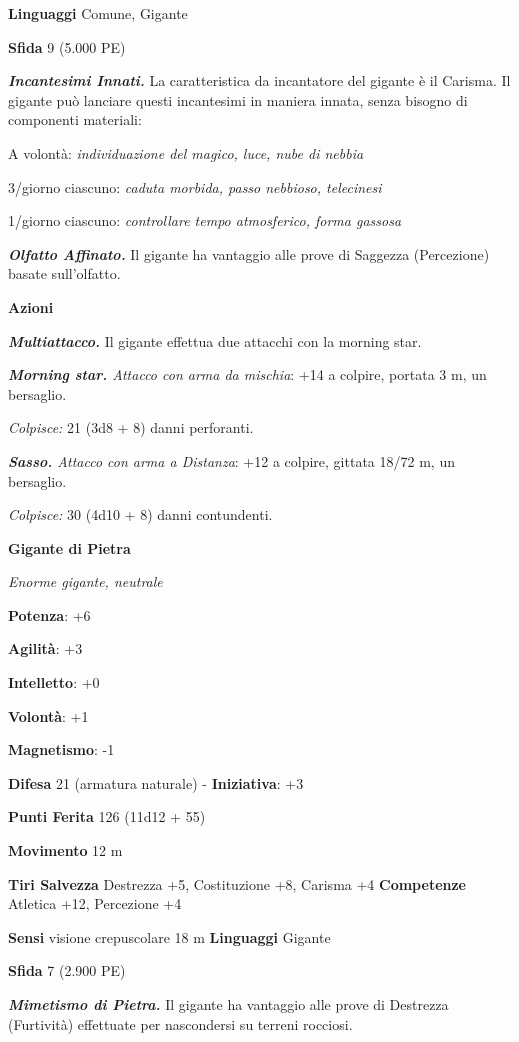 \begin{multicols}{2}
\textbf{Linguaggi} Comune, Gigante

\textbf{Sfida} 9 (5.000 PE)\smallskip

\emph{\textbf{Incantesimi Innati.}} La caratteristica da incantatore del
gigante è il Carisma. Il gigante può lanciare questi incantesimi in
maniera innata, senza bisogno di componenti materiali:

A volontà: \emph{individuazione del magico, luce, nube di nebbia}

3/giorno ciascuno: \emph{caduta morbida, passo nebbioso, telecinesi}

1/giorno ciascuno: \emph{controllare tempo atmosferico, forma gassosa}

\emph{\textbf{Olfatto Affinato.}} Il gigante ha vantaggio alle prove di
Saggezza (Percezione) basate sull'olfatto.

\smallskip\textbf{Azioni}

\emph{\textbf{Multiattacco.}} Il gigante effettua due attacchi con la
morning star.

\emph{\textbf{Morning star.} Attacco con arma da mischia}: +14 a
colpire, portata 3 m, un bersaglio.

\emph{Colpisce:} 21 (3d8 + 8) danni perforanti.

\emph{\textbf{Sasso.} Attacco con arma a Distanza}: +12 a colpire,
gittata 18/72 m, un bersaglio.

\emph{Colpisce:} 30 (4d10 + 8) danni contundenti.

\textbf{Gigante di Pietra}

\emph{Enorme gigante, neutrale}

\textbf{Potenza}: +6

\textbf{Agilità}: +3

\textbf{Intelletto}: +0

\textbf{Volontà}: +1

\textbf{Magnetismo}: -1

\textbf{Difesa} 21 (armatura naturale) - \textbf{Iniziativa}: +3

\textbf{Punti Ferita} 126 (11d12 + 55)

\textbf{Movimento} 12 m

\textbf{Tiri Salvezza} Destrezza +5, Costituzione +8, Carisma +4
\textbf{Competenze} Atletica +12, Percezione +4

\textbf{Sensi} visione crepuscolare 18 m
\textbf{Linguaggi} Gigante

\textbf{Sfida} 7 (2.900 PE)\smallskip

\emph{\textbf{Mimetismo di Pietra.}} Il gigante ha vantaggio alle prove
di Destrezza (Furtività) effettuate per nascondersi su terreni rocciosi.


\end{multicols}
